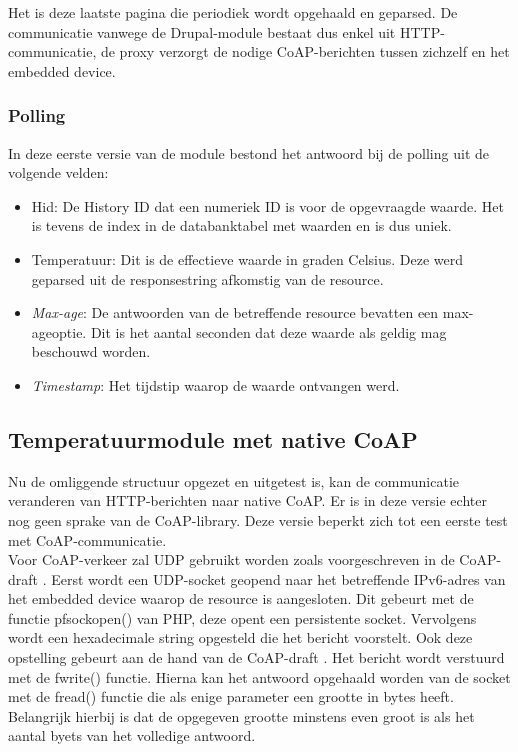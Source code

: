 Het is deze laatste pagina die periodiek wordt opgehaald en geparsed. De communicatie vanwege de Drupal-module bestaat dus enkel uit HTTP-communicatie, de proxy verzorgt de nodige CoAP-berichten tussen zichzelf en het embedded device.

\subsubsection{Polling}
In deze eerste versie van de module bestond het antwoord bij de polling uit de volgende velden:
\begin{itemize}
\item Hid: De History ID dat een numeriek ID is voor de opgevraagde waarde. Het is tevens de index in de databanktabel met waarden en is dus uniek.
\item Temperatuur: Dit is de effectieve waarde in graden Celsius. Deze werd geparsed uit de responsestring afkomstig van de resource.
\item \textit{Max-age}: De antwoorden van de betreffende resource bevatten een max-ageoptie. Dit is het aantal seconden dat deze waarde als geldig mag beschouwd worden.
\item \textit{Timestamp}: Het tijdstip waarop de waarde ontvangen werd.
\end{itemize}

\subsection{Temperatuurmodule met native CoAP}
Nu de omliggende structuur opgezet en uitgetest is, kan de communicatie veranderen van HTTP-berichten naar native CoAP. Er is in deze versie echter nog geen sprake van de CoAP-library. Deze versie beperkt zich tot een eerste test met CoAP-communicatie.\\

Voor CoAP-verkeer zal UDP gebruikt worden zoals voorgeschreven in de CoAP-draft \cite{coapDraft}. Eerst wordt een UDP-socket geopend naar het betreffende IPv6-adres van het embedded device waarop de resource is aangesloten. Dit gebeurt met de functie pfsockopen() van PHP, deze opent een persistente socket. Vervolgens wordt een hexadecimale string opgesteld die het bericht voorstelt. Ook deze opstelling gebeurt aan de hand van de CoAP-draft \cite{coapDraft}. Het bericht wordt verstuurd met de fwrite() functie. Hierna kan het antwoord opgehaald worden van de socket met de fread() functie die als enige parameter een grootte in bytes heeft. Belangrijk hierbij is dat de opgegeven grootte minstens even groot is als het aantal byets van het volledige antwoord.\\

